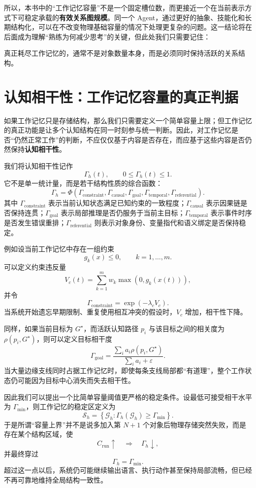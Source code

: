 所以，本书中的“工作记忆容量”不是一个固定槽位数，而更接近一个在当前表示方式下可稳定承载的\textbf{有效关系图规模}。同一个 Agent，通过更好的抽象、技能化和长期结构化，可以在不改变物理基础容量的情况下处理更复杂的问题。这一结论将在后面成为理解“熟练为何减少思考”的关键，但此处我们只需要记住：

\begin{conclusion}
真正耗尽工作记忆的，通常不是对象数量本身，而是必须同时保持活跃的关系结构。
\end{conclusion}


\section{认知相干性：工作记忆容量的真正判据}
\label{sec:cognitive-coherence}

如果工作记忆只是存储结构，那么我们只需要定义一个简单容量上限；但工作记忆的真正功能是让多个认知结构在同一时刻参与统一判断。因此，对工作记忆是否“仍然正常工作”的判断，不应仅仅基于内容是否存在，而应基于这些内容是否仍然保持\textbf{认知相干性}。

我们将认知相干性记作
\[
\Gamma_h(t),
\qquad
0\leq\Gamma_h(t)\leq1.
\]
它不是单一统计量，而是若干结构性质的综合函数：
\[
\Gamma_h
=
\Phi
\left(
\Gamma_{\mathrm{constraint}},
\Gamma_{\mathrm{causal}},
\Gamma_{\mathrm{goal}},
\Gamma_{\mathrm{temporal}},
\Gamma_{\mathrm{referential}}
\right).
\]
其中 $\Gamma_{\mathrm{constraint}}$ 表示当前认知状态满足已知约束的一致程度；$\Gamma_{\mathrm{causal}}$ 表示因果链是否保持连贯；$\Gamma_{\mathrm{goal}}$ 表示局部推理是否仍服务于当前主目标；$\Gamma_{\mathrm{temporal}}$ 表示事件时序是否发生错误重排；$\Gamma_{\mathrm{referential}}$ 则表示对象身份、变量指代和语义绑定是否保持稳定。

例如设当前工作记忆中存在一组约束
\[
g_k(x)\leq 0,
\qquad
k=1,\ldots,m.
\]
可以定义约束违反量
\[
V_c(t)
=
\sum_{k=1}^{m}
w_k
\max
\left(
0,g_k(x(t))
\right),
\]
并令
\[
\Gamma_{\mathrm{constraint}}
=
\exp
\left(
-\lambda_c V_c
\right).
\]
当系统开始遗忘早期限制、重复使用相互冲突的假设时，$V_c$ 增加，相干性下降。

同样，如果当前目标为 $G^\star$，而活跃认知路径 $p_i$ 与该目标之间的相关度为 $\rho(p_i,G^\star)$，则可以定义目标相干度
\[
\Gamma_{\mathrm{goal}}
=
\frac{
\sum_i a_i\rho(p_i,G^\star)
}{
\sum_i a_i+\varepsilon
}.
\]
当大量边缘支线同时占据工作记忆时，即使每条支线局部都“有道理”，整个工作状态仍可能因为目标中心消失而失去相干性。

因此我们可以提出一个比简单容量阈值更严格的稳定条件。设最低可接受相干水平为 $\Gamma_{\min}$，则工作记忆的稳定区定义为
\[
\mathcal{S}_h
=
\left\{
\mathcal{G}_h:
\Gamma_h(\mathcal{G}_h)
\geq
\Gamma_{\min}
\right\}.
\]
于是所谓“容量上界”并不是说多加入第 $N+1$ 个对象后物理存储突然失败，而是存在某个结构区域，使
\[
C_{\mathrm{run}}\uparrow
\quad\Rightarrow\quad
\Gamma_h\downarrow,
\]
并最终穿过
\[
\Gamma_h=
\Gamma_{\min}.
\]
超过这一点以后，系统仍可能继续输出语言、执行动作甚至保持局部流畅，但已经不再可靠地维持全局结构一致性。

